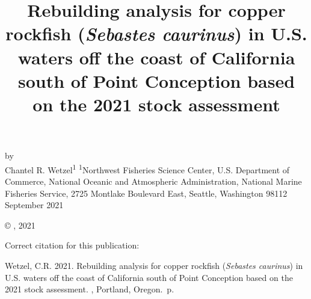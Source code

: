 \documentclass[11pt,
  english,
  a4paper,
]{article}
\date{}
\newcommand{\trTitle}{Rebuilding analysis for copper rockfish (\emph{Sebastes caurinus}) in U.S. waters off the coast of California south of Point Conception based on the 2021 stock assessment}
\newcommand{\trYear}{2021}
\newcommand{\trMonth}{September}
\newcommand{\trAuthsBack}{Wetzel, C.R}
\newcommand{\trCitation}{
\begin{hangparas}{1em}{1}
\trAuthsBack{}. \trYear{}. \trTitle{}. \glsentrylong{pfmc}, Portland, Oregon. \pageref{LastPage}{}\,p.
\end{hangparas}}
\begin{document}

\renewcommand*{\thefootnote}{\fnsymbol{footnote}}

\small
\thispagestyle{empty}
\noindent
\begin{center}
\title{Rebuilding analysis for copper rockfish (\emph{Sebastes caurinus}) in U.S. waters off the coast of California south of Point Conception based on the 2021 stock assessment}
\vspace{1.5cm}
{\Large\textbf{}}
\vfill
by\\
Chantel R. Wetzel\textsuperscript{1}\vfill
\textsuperscript{1}Northwest Fisheries Science Center, U.S. Department of Commerce, National Oceanic and Atmospheric Administration, National Marine Fisheries Service, 2725 Montlake Boulevard East, Seattle, Washington 98112\vfill
\trMonth{} \trYear{}
\end{center}
\clearpage

\thispagestyle{empty}
\vspace*{\fill}
\begin{center}
\copyright{} , \trYear{}\\
\end{center}
\par
\bigskip
\noindent
Correct citation for this publication:
\bigskip
\par
\trCitation{}
\clearpage


\tableofcontents\clearpage
\label{TRlastRoman}
\clearpage

\newpage
\thispagestyle{empty} %

\pagestyle{plain}  %
\renewcommand*{\thefootnote}{\arabic{footnote}}  %
\setcounter{footnote}{0}  %
\renewcommand{\headrulewidth}{0.5pt}
\renewcommand{\footrulewidth}{0.5pt}
\end{document}
